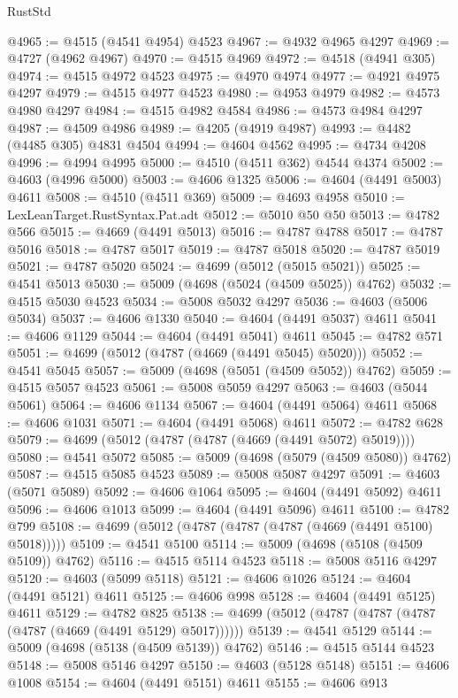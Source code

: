 \begin{lexlean}{RustStd}
\begin{coremodule}
@4965 := @4515 (@4541 @4954) @4523
@4967 := @4932 @4965 @4297
@4969 := @4727 (@4962 @4967)
@4970 := @4515 @4969
@4972 := @4518 (@4941 @305)
@4974 := @4515 @4972 @4523
@4975 := @4970 @4974
@4977 := @4921 @4975 @4297
@4979 := @4515 @4977 @4523
@4980 := @4953 @4979
@4982 := @4573 @4980 @4297
@4984 := @4515 @4982 @4584
@4986 := @4573 @4984 @4297
@4987 := @4509 @4986
@4989 := @4205 (@4919 @4987)
@4993 := @4482 (@4485 @305) @4831 @4504
@4994 := @4604 @4562
@4995 := @4734 @4208
@4996 := @4994 @4995
@5000 := @4510 (@4511 @362) @4544 @4374
@5002 := @4603 (@4996 @5000)
@5003 := @4606 @1325
@5006 := @4604 (@4491 @5003) @4611
@5008 := @4510 (@4511 @369)
@5009 := @4693 @4958
@5010 := LexLeanTarget.RustSyntax.Pat.adt
@5012 := @5010 @50 @50
@5013 := @4782 @566
@5015 := @4669 (@4491 @5013)
@5016 := @4787 @4788
@5017 := @4787 @5016
@5018 := @4787 @5017
@5019 := @4787 @5018
@5020 := @4787 @5019
@5021 := @4787 @5020
@5024 := @4699 (@5012 (@5015 @5021))
@5025 := @4541 @5013
@5030 := @5009 (@4698 (@5024 (@4509 @5025)) @4762)
@5032 := @4515 @5030 @4523
@5034 := @5008 @5032 @4297
@5036 := @4603 (@5006 @5034)
@5037 := @4606 @1330
@5040 := @4604 (@4491 @5037) @4611
@5041 := @4606 @1129
@5044 := @4604 (@4491 @5041) @4611
@5045 := @4782 @571
@5051 := @4699 (@5012 (@4787 (@4669 (@4491 @5045) @5020)))
@5052 := @4541 @5045
@5057 := @5009 (@4698 (@5051 (@4509 @5052)) @4762)
@5059 := @4515 @5057 @4523
@5061 := @5008 @5059 @4297
@5063 := @4603 (@5044 @5061)
@5064 := @4606 @1134
@5067 := @4604 (@4491 @5064) @4611
@5068 := @4606 @1031
@5071 := @4604 (@4491 @5068) @4611
@5072 := @4782 @628
@5079 := @4699 (@5012 (@4787 (@4787 (@4669 (@4491 @5072) @5019))))
@5080 := @4541 @5072
@5085 := @5009 (@4698 (@5079 (@4509 @5080)) @4762)
@5087 := @4515 @5085 @4523
@5089 := @5008 @5087 @4297
@5091 := @4603 (@5071 @5089)
@5092 := @4606 @1064
@5095 := @4604 (@4491 @5092) @4611
@5096 := @4606 @1013
@5099 := @4604 (@4491 @5096) @4611
@5100 := @4782 @799
@5108 := @4699 (@5012 (@4787 (@4787 (@4787 (@4669 (@4491 @5100) @5018)))))
@5109 := @4541 @5100
@5114 := @5009 (@4698 (@5108 (@4509 @5109)) @4762)
@5116 := @4515 @5114 @4523
@5118 := @5008 @5116 @4297
@5120 := @4603 (@5099 @5118)
@5121 := @4606 @1026
@5124 := @4604 (@4491 @5121) @4611
@5125 := @4606 @998
@5128 := @4604 (@4491 @5125) @4611
@5129 := @4782 @825
@5138 := @4699 (@5012 (@4787 (@4787 (@4787 (@4787 (@4669 (@4491 @5129) @5017))))))
@5139 := @4541 @5129
@5144 := @5009 (@4698 (@5138 (@4509 @5139)) @4762)
@5146 := @4515 @5144 @4523
@5148 := @5008 @5146 @4297
@5150 := @4603 (@5128 @5148)
@5151 := @4606 @1008
@5154 := @4604 (@4491 @5151) @4611
@5155 := @4606 @913

\end{coremodule}
\end{lexlean}
